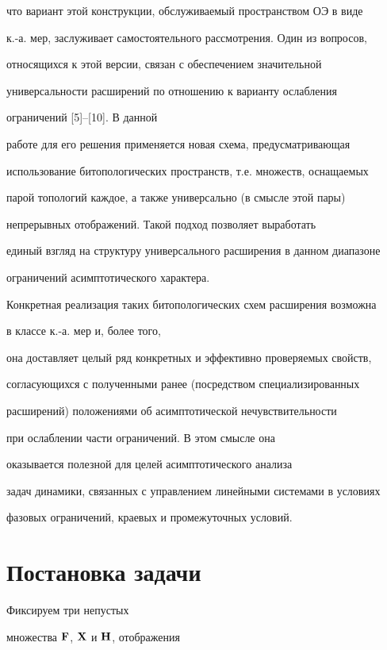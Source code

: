 что вариант этой конструкции, обслуживаемый пространством ОЭ в виде


к.-а. мер, заслуживает самостоятельного рассмотрения. Один из вопросов,


относящихся к этой версии, связан с обеспечением значительной


универсальности расширений по отношению к варианту ослабления


ограничений [5]--[10]. В данной


работе для его решения применяется новая схема, предусматривающая


использование битопологических пространств, т.е. множеств, оснащаемых


парой топологий каждое, а также универсально (в смысле этой пары)


непрерывных отображений. Такой подход позволяет выработать


единый взгляд на структуру универсального расширения в данном диапазоне


ограничений асимптотического характера.


Конкретная реализация таких битопологических схем расширения возможна


в классе к.-а. мер и, более того,


она доставляет целый ряд конкретных и эффективно проверяемых свойств,


согласующихся с полученными ранее (посредством специализированных


расширений) положениями об асимптотической нечувствительности


при ослаблении части ограничений. В этом смысле она


оказывается полезной для целей асимптотического анализа


задач динамики, связанных с управлением линейными системами в условиях


фазовых ограничений, краевых и промежуточных условий.





\section{Постановка задачи} 





Фиксируем три непустых


множества ${\bold F}$, ${\bold X}$ и ${\bold H}$, отображения


